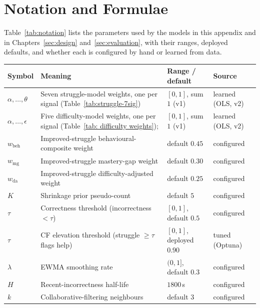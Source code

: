 \section{Notation and Formulae} \label{app:formulae}

Table~\ref{tab:notation} lists the parameters used by the models in this appendix and in
Chapters~\ref{sec:design} and~\ref{sec:evaluation}, with their ranges, deployed defaults, and
whether each is configured by hand or learned from data.

\begin{table}[H]
    \centering
    \begin{tabular}{|l|p{}|l|l|}
    \hline
    \textbf{Symbol} & \textbf{Meaning} & \textbf{Range / default} & \textbf{Source} \\
    \hline
    $\alpha,\ldots,\theta$ & Seven struggle-model weights, one per signal (Table~\ref{tab:struggle-7sig}) & $[0,1]$, sum $1$ (v1) & learned (OLS, v2) \\
    \hline
    $\alpha,\ldots,\epsilon$ & Five difficulty-model weights, one per signal (Table~\ref{tab: difficulty weights}); & $[0,1]$, sum $1$ (v1) & learned (OLS, v2) \\
    \hline
    $w_{\mathrm{beh}}$ & Improved-struggle behavioural-composite weight & default $0.45$ & configured \\
    \hline
    $w_{\mathrm{mg}}$ & Improved-struggle mastery-gap weight & default $0.30$ & configured \\
    \hline
    $w_{\mathrm{da}}$ & Improved-struggle difficulty-adjusted weight & default $0.25$ & configured \\
    \hline
    $K$     & Shrinkage prior pseudo-count        & default $5$            & configured \\
    \hline
    $\tau$  & Correctness threshold (incorrectness $<\tau$) & $[0,1]$, default $0.5$ & configured \\
    \hline
    $\tau$  & CF elevation threshold (struggle $\ge\tau$ flags help) & $[0,1]$, deployed $0.90$ & tuned (Optuna) \\
    \hline
    $\lambda$ & EWMA smoothing rate               & $(0,1]$, default $0.3$ & configured \\
    \hline
    $H$     & Recent-incorrectness half-life      & $1800$\,s              & configured \\
    \hline
    $k$     & Collaborative-filtering neighbours  & default $3$            & configured \\
    \hline

\end{tabular}
\end{table}
